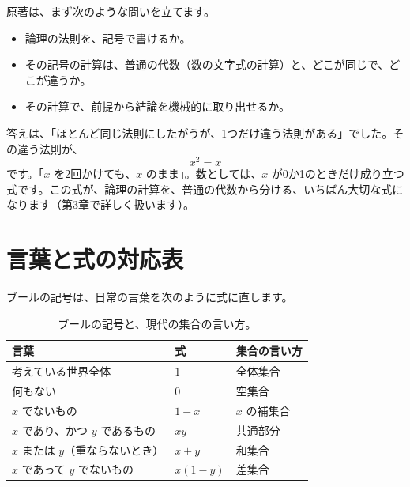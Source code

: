 \documentclass[a4paper,11pt,openany]{ltjsbook}
\begin{document}
原著は、まず次のような問いを立てます。

\begin{itemize}[leftmargin=*]
\item 論理の法則を、記号で書けるか。
\item その記号の計算は、普通の代数（数の文字式の計算）と、どこが同じで、どこが違うか。
\item その計算で、前提から結論を機械的に取り出せるか。
\end{itemize}

答えは、「ほとんど同じ法則にしたがうが、1つだけ違う法則がある」でした。その違う法則が、
\[
x^2=x
\]
です。「$x$ を2回かけても、$x$ のまま」。数としては、$x$ が0か1のときだけ成り立つ式です。この式が、論理の計算を、普通の代数から分ける、いちばん大切な式になります（第3章で詳しく扱います）。

\section{言葉と式の対応表}

ブールの記号は、日常の言葉を次のように式に直します。

\begin{table}[htbp]
\centering
\begin{tabular}{lll}
\toprule
言葉 & 式 & 集合の言い方\\
\midrule
考えている世界全体 & $1$ & 全体集合\\
何もない & $0$ & 空集合\\
$x$ でないもの & $1-x$ & $x$ の補集合\\
$x$ であり、かつ $y$ であるもの & $xy$ & 共通部分\\
$x$ または $y$（重ならないとき） & $x+y$ & 和集合\\
$x$ であって $y$ でないもの & $x(1-y)$ & 差集合\\
\bottomrule
\end{tabular}
\caption{ブールの記号と、現代の集合の言い方。}
\end{table}
\end{document}
